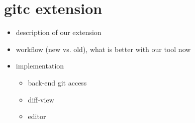 \section{gitc extension}
\label{sec:Extension}

\begin{itemize}
	\item description of our extension
	\item workflow (new vs. old), what is better with our tool now
	\item implementation
	\begin{itemize}
		\item back-end git access
		\item diff-view
		\item editor
	\end{itemize}
\end{itemize}